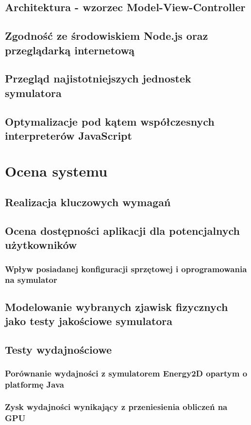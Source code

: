 \documentclass[pdflatex,11pt]{aghdpl}
\begin{document}
	\section{Architektura - wzorzec Model-View-Controller}
	\section{Zgodność ze środowiskiem Node.js oraz przeglądarką internetową}
	\section{Przegląd najistotniejszych jednostek symulatora}
	\section{Optymalizacje pod kątem współczesnych interpreterów JavaScript}


	
\chapter{Ocena systemu}
	\section{Realizacja kluczowych wymagań}
	\section{Ocena dostępności aplikacji dla potencjalnych użytkowników}
		\subsection{Wpływ posiadanej konfiguracji sprzętowej i oprogramowania na symulator}
	\section{Modelowanie wybranych zjawisk fizycznych jako testy jakościowe symulatora}
	\section{Testy wydajnościowe}
		\subsection{Porównanie wydajności z symulatorem Energy2D opartym o platformę Java}
		\subsection{Zysk wydajności wynikający z przeniesienia obliczeń na GPU}
\end{document}
